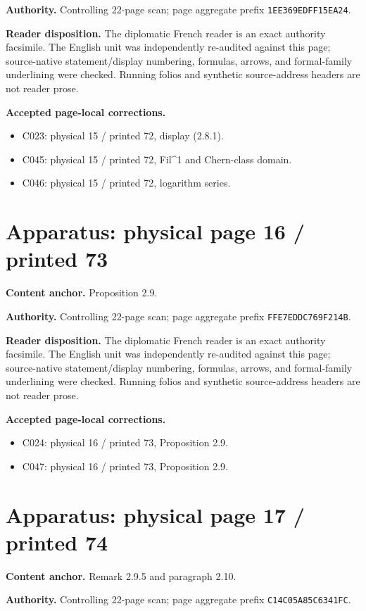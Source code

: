 \documentclass[10pt]{article}
\begin{document}
\textbf{Authority.} Controlling 22-page scan; page aggregate prefix \texttt{1EE369EDFF15EA24}.

\textbf{Reader disposition.} The diplomatic French reader is an exact authority facsimile. The English unit was independently re-audited against this page; source-native statement/display numbering, formulas, arrows, and formal-family underlining were checked. Running folios and synthetic source-address headers are not reader prose.

\textbf{Accepted page-local corrections.} \begin{itemize}
\item C023: physical 15 / printed 72, display (2.8.1).
\item C045: physical 15 / printed 72, Fil\textasciicircum{}1 and Chern-class domain.
\item C046: physical 15 / printed 72, logarithm series.
\end{itemize}
\newpage
\setcounter{footnote}{0}
\fontsize{10.2pt}{12.04pt}\selectfont
\section*{Apparatus: physical page 16 / printed 73}
\textbf{Content anchor.} Proposition 2.9.

\textbf{Authority.} Controlling 22-page scan; page aggregate prefix \texttt{FFE7EDDC769F214B}.

\textbf{Reader disposition.} The diplomatic French reader is an exact authority facsimile. The English unit was independently re-audited against this page; source-native statement/display numbering, formulas, arrows, and formal-family underlining were checked. Running folios and synthetic source-address headers are not reader prose.

\textbf{Accepted page-local corrections.} \begin{itemize}
\item C024: physical 16 / printed 73, Proposition 2.9.
\item C047: physical 16 / printed 73, Proposition 2.9.
\end{itemize}
\newpage
\setcounter{footnote}{0}
\fontsize{10.2pt}{12.04pt}\selectfont
\section*{Apparatus: physical page 17 / printed 74}
\textbf{Content anchor.} Remark 2.9.5 and paragraph 2.10.

\textbf{Authority.} Controlling 22-page scan; page aggregate prefix \texttt{C14C05A85C6341FC}.
\end{document}
